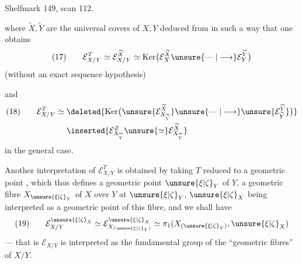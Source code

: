 Shelfmark 149, scan 112.


where $\widetilde X,\widetilde Y$ are the universal covers of $X,Y$ deduced from  in such a way that one obtains
\[
(17)\qquad \mathcal E_{X/Y}^T\simeq\mathcal E_{X/Y}^{\widetilde X}\simeq\operatorname{Ker}\bigl(\mathcal E_X^{\widetilde X}\unsure{\mathrel{\text{---}}|\longrightarrow}\mathcal E_Y^{\widetilde Y}\bigr)
\]
(without an exact sequence hypothesis)

and
\[
\begin{aligned}
(18)\qquad \mathcal E_{X/Y}^T\simeq{}&\deleted{\operatorname{Ker}\bigl(\unsure{\mathcal E_{X_{\widetilde Y}}^{\widetilde X}}\unsure{\mathrel{\text{---}}|\longrightarrow}\unsure{\mathcal E_{\widetilde Y}^{\widetilde Y}}\bigr)}\\
&\inserted{\mathcal E_{X_{\widetilde Y}}^Z\unsure{\simeq}\mathcal E_{X_{\widetilde Y}}^{\widetilde X}}
\end{aligned}
\]
in the general case.


Another interpretation of $\mathcal E_{X/Y}^T$ is obtained by taking $T$ reduced to a geometric point , which thus defines a geometric point $\unsure{\xi|\zeta}_Y$ of $Y$, a geometric fibre $X_{\unsure{\xi|\zeta}_Y}$ of $X$ over $Y$ at $\unsure{\xi|\zeta}_Y$, $\unsure{\xi|\zeta}_X$ being interpreted as a geometric point of this fibre, and we shall have
\[
(19)\qquad \mathcal E_{X/Y}^{\unsure{\xi|\zeta}_X}\simeq\mathcal E_{X_{(\unsure{\xi|\zeta}_Y)}}^{\unsure{\xi|\zeta}_X}\simeq\pi_1(X_{(\unsure{\xi|\zeta}_Y)},\unsure{\xi|\zeta}_X)
\]
--- that is $\mathcal E_{X/Y}$ is interpreted as the fundamental group of the ``geometric fibres'' of $X/Y$.

